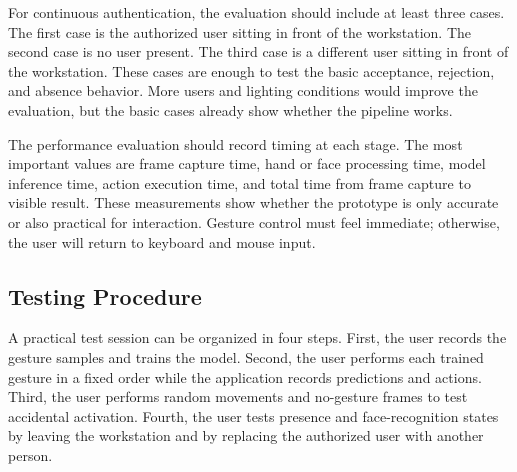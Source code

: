 \documentclass[10pt,twocolumn]{article}
\begin{document}
For continuous authentication, the evaluation should include at least three cases.
The first case is the authorized user sitting in front of the workstation.
The second case is no user present.
The third case is a different user sitting in front of the workstation.
These cases are enough to test the basic acceptance, rejection, and absence behavior.
More users and lighting conditions would improve the evaluation, but the basic cases already show whether the pipeline works.

The performance evaluation should record timing at each stage.
The most important values are frame capture time, hand or face processing time, model inference time, action execution time, and total time from frame capture to visible result.
These measurements show whether the prototype is only accurate or also practical for interaction.
Gesture control must feel immediate; otherwise, the user will return to keyboard and mouse input.

\begin{table}[H]
  \caption{Planned evaluation metrics}
  \label{tab:evaluation}
  \centering
\end{table}
\FloatBarrier

\subsection{Testing Procedure}
A practical test session can be organized in four steps.
First, the user records the gesture samples and trains the model.
Second, the user performs each trained gesture in a fixed order while the application records predictions and actions.
Third, the user performs random movements and no-gesture frames to test accidental activation.
Fourth, the user tests presence and face-recognition states by leaving the workstation and by replacing the authorized user with another person.
\end{document}
